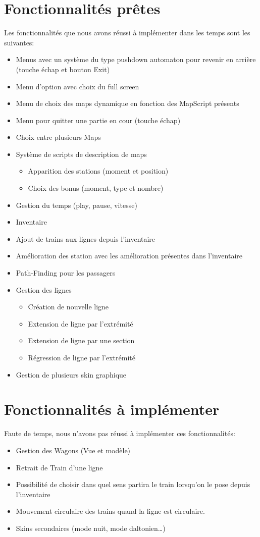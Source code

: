 \documentclass[report, backcover, french, nodocumentinfo]{upmethodology-document}
\begin{document}
	\section{Fonctionnalités prêtes}
		\p{}
		Les fonctionnalités que nous avons réussi à implémenter dans les temps sont les suivantes:
		\begin{itemize}
			\item Menus avec un système du type pushdown automaton pour revenir en arrière (touche échap et bouton Exit)
			\item Menu d'option avec choix du full screen
			\item Menu de choix des maps dynamique en fonction des MapScript présents
			\item Menu pour quitter une partie en cour (touche échap)
			\item Choix entre plusieurs Maps
			\item Système de scripts de description de maps
				\begin{itemize}
					\item Apparition des stations (moment et position)
					\item Choix des bonus (moment, type et nombre)
				\end{itemize}
			\item Gestion du temps (play, pause, vitesse)
			\item Inventaire
			\item Ajout de trains aux lignes depuis l'inventaire
			\item Amélioration des station avec les amélioration présentes dans l'inventaire
			\item Path-Finding pour les passagers
			\item Gestion des lignes
				\begin{itemize}
					\item Création de nouvelle ligne
					\item Extension de ligne par l'extrémité
					\item Extension de ligne par une section
					\item Régression de ligne par l'extrémité
				\end{itemize}
			\item Gestion de plusieurs skin graphique
		\end{itemize}
	\section{Fonctionnalités à implémenter}
		\p{}
		Faute de temps, nous n'avons pas réussi à implémenter ces fonctionnalités:
		\begin{itemize}
			\item Gestion des Wagons (Vue et modèle)
			\item Retrait de Train d'une ligne
			\item Possibilité de choisir dans quel sens partira le train lorsqu'on le pose depuis l'inventaire
			\item Mouvement circulaire des trains quand la ligne est circulaire.
			\item Skins secondaires (mode nuit, mode daltonien\ldots)
		\end{itemize}
\end{document}
